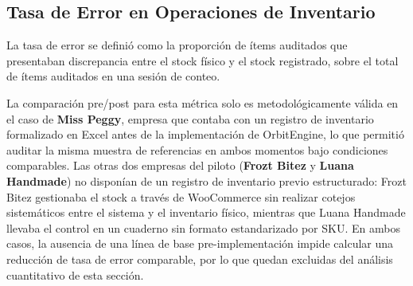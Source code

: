 \subsection{Tasa de Error en Operaciones de Inventario}\label{tasa-de-error-en-operaciones-de-inventario}

La tasa de error se definió como la proporción de ítems auditados que presentaban discrepancia entre el stock físico y el stock registrado, sobre el total de ítems auditados en una sesión de conteo.

La comparación pre/post para esta métrica solo es metodológicamente válida en el caso de \textbf{Miss Peggy}, empresa que contaba con un registro de inventario formalizado en Excel antes de la implementación de OrbitEngine, lo que permitió auditar la misma muestra de referencias en ambos momentos bajo condiciones comparables. Las otras dos empresas del piloto (\textbf{Frozt Bitez} y \textbf{Luana Handmade}) no disponían de un registro de inventario previo estructurado: Frozt Bitez gestionaba el stock a través de WooCommerce sin realizar cotejos sistemáticos entre el sistema y el inventario físico, mientras que Luana Handmade llevaba el control en un cuaderno sin formato estandarizado por SKU. En ambos casos, la ausencia de una línea de base pre-implementación impide calcular una reducción de tasa de error comparable, por lo que quedan excluidas del análisis cuantitativo de esta sección.



